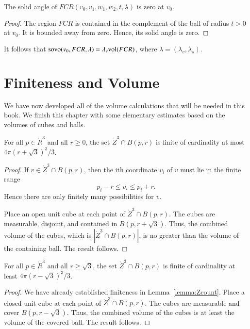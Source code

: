 \begin{lemma}  The solid angle of $FCR(v_0,v_1,w_1,w_2,t,\lambda)$
is zero at $v_0$.
\end{lemma}

\begin{proof}  The region $FCR$ is contained in the complement
of the ball of radius $t>0$ at $v_0$.  It is bounded away from
zero.  Hence, its solid angle is zero.
\end{proof}

It follows that ${\operatorname{sovo}}(v_0,FCR,\lambda) = \lambda_v{\operatorname{vol}}(FCR)$,
where $\lambda=(\lambda_v,\lambda_s)$.



\section{Finiteness and Volume}

We have now developed all of the volume calculations that will
be needed in this book.   We finish this chapter with some 
elementary estimates based on the volumes of  cubes and balls.

\begin{lemma}
    For all $p\in\ring{R}^3$ and all $r\ge 0$, the set
    $\ring{Z}^3\cap B(p,r)$ is finite of cardinality at most
    $4\pi (r+\sqrt3)^3/3$.
\end{lemma}

\begin{proof}  If $v\in\ring{Z}^3\cap B(p,r)$, then the ith
coordinate $v_i$ of $v$ must lie in the finite range
    $$
    p_i - r \le v_i \le p_i + r.
    $$
Hence there are only finitely many possibilities for $v$.


Place an open unit cube at each point of $\ring{Z}^3\cap B(p,r)$.
The cubes are measurable, disjoint, and contained in
$B(p,r+\sqrt3)$.  Thus, the combined volume of the cubes, which is
$|\ring{Z}^3\cap B(p,r)|$,  is no greater than the volume of the
containing ball.  The result follows.
\end{proof}

\begin{lemma}
  For all $p\in\ring{R}^3$ and all $r\ge\sqrt3$, the set
    $\ring{Z}^3\cap B(p,r)$ is finite of cardinality at least
    $4\pi (r-\sqrt3)^3/3$.
\end{lemma}

\begin{proof} We have already established finiteness in
Lemma~\ref{lemma:Zcount}.  Place a closed unit cube at each point
of $\ring{Z}^3\cap B(p,r)$.  The cubes are measurable and cover
$B(p,r-\sqrt3)$.  Thus, the combined volume of the cubes is at
least the volume of the covered ball.  The result follows.
\end{proof}

